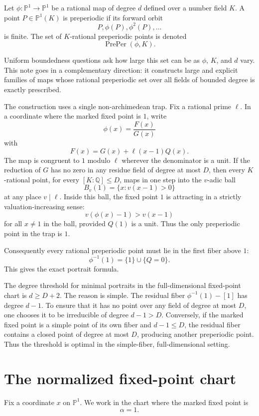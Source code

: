 \documentclass[11pt]{article}
\begin{document}
Let \(\phi:\mathbb P^1\to\mathbb P^1\) be a rational map of degree \(d\) defined over a number field \(K\). A point \(P\in\mathbb P^1(K)\) is preperiodic if its forward orbit
\[
P,\phi(P),\phi^2(P),\ldots
\]
is finite. The set of \(K\)-rational preperiodic points is denoted
\[
\operatorname{PrePer}(\phi,K).
\]

Uniform boundedness questions ask how large this set can be as \(\phi\), \(K\), and \(d\) vary. This note goes in a complementary direction: it constructs large and explicit families of maps whose rational preperiodic set over all fields of bounded degree is exactly prescribed.

The construction uses a single non-archimedean trap. Fix a rational prime \(\ell\). In a coordinate where the marked fixed point is \(1\), write
\[
\phi(x)=\frac{F(x)}{G(x)}
\]
with
\[
F(x)=G(x)+\ell(x-1)Q(x).
\]
The map is congruent to \(1\) modulo \(\ell\) wherever the denominator is a unit. If the reduction of \(G\) has no zero in any residue field of degree at most \(D\), then every \(K\)-rational point, for every \([K:\mathbb Q]\le D\), maps in one step into the \(v\)-adic ball
\[
B_v(1)=\{x:v(x-1)>0\}
\]
at any place \(v\mid\ell\). Inside this ball, the fixed point \(1\) is attracting in a strictly valuation-increasing sense:
\[
v(\phi(x)-1)>v(x-1)
\]
for all \(x\ne1\) in the ball, provided \(Q(1)\) is a unit. Thus the only preperiodic point in the trap is \(1\).

Consequently every rational preperiodic point must lie in the first fiber above \(1\):
\[
\phi^{-1}(1)=\{1\}\cup\{Q=0\}.
\]
This gives the exact portrait formula.

The degree threshold for minimal portraits in the full-dimensional fixed-point chart is \(d\ge D+2\). The reason is simple. The residual fiber \(\phi^{-1}(1)-[1]\) has degree \(d-1\). To ensure that it has no point over any field of degree at most \(D\), one chooses it to be irreducible of degree \(d-1>D\). Conversely, if the marked fixed point is a simple point of its own fiber and \(d-1\le D\), the residual fiber contains a closed point of degree at most \(D\), producing another preperiodic point. Thus the threshold is optimal in the simple-fiber, full-dimensional setting.

\section{The normalized fixed-point chart}

Fix a coordinate \(x\) on \(\mathbb P^1\). We work in the chart where the marked fixed point is
\[
\alpha=1.
\]
\end{document}
